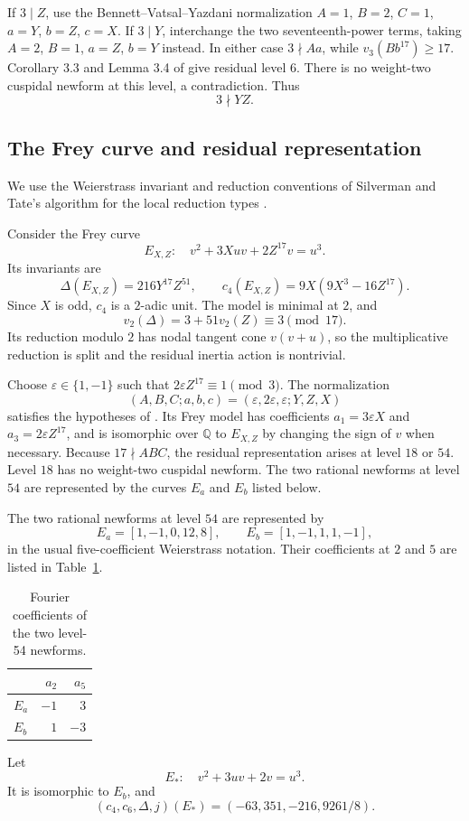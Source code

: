 \documentclass[11pt,a4paper]{article}
\theoremstyle{definition}\newtheorem{definition}[theorem]{Definition}
\theoremstyle{remark}\newtheorem{remark}[theorem]{Remark}
\begin{document}
If $3\mid Z$, use the Bennett--Vatsal--Yazdani normalization $A=1$, $B=2$, $C=1$, $a=Y$, $b=Z$, $c=X$. If $3\mid Y$, interchange the two seventeenth-power terms, taking $A=2$, $B=1$, $a=Z$, $b=Y$ instead. In either case $3\nmid Aa$, while $v_3(Bb^{17})\ge17$. Corollary 3.3 and Lemma 3.4 of \cite{BVY} give residual level $6$. There is no weight-two cuspidal newform at this level, a contradiction. Thus
\[
3\nmid YZ.
\]

\subsection{The Frey curve and residual representation}

We use the Weierstrass invariant and reduction conventions of Silverman \cite{Silverman} and Tate's algorithm for the local reduction types \cite{Tate}.

Consider the Frey curve
\[
E_{X,Z}:\quad v^2+3Xuv+2Z^{17}v=u^3.
\]
Its invariants are
\[
\Delta(E_{X,Z})=216Y^{17}Z^{51},\qquad
c_4(E_{X,Z})=9X(9X^3-16Z^{17}).
\]
Since $X$ is odd, $c_4$ is a $2$-adic unit. The model is minimal at $2$, and
\[
v_2(\Delta)=3+51v_2(Z)\equiv3\pmod{17}.
\]
Its reduction modulo $2$ has nodal tangent cone $v(v+u)$, so the multiplicative reduction is split and the residual inertia action is nontrivial.

Choose $\varepsilon\in\{1,-1\}$ such that $2\varepsilon Z^{17}\equiv1\pmod3$. The normalization
\[
(A,B,C;a,b,c)=(\varepsilon,2\varepsilon,\varepsilon;Y,Z,X)
\]
satisfies the hypotheses of \cite[Lemmas 3.1 and 3.4]{BVY}. Its Frey model has coefficients $a_1=3\varepsilon X$ and $a_3=2\varepsilon Z^{17}$, and is isomorphic over $\mathbb Q$ to $E_{X,Z}$ by changing the sign of $v$ when necessary. Because $17\nmid ABC$, the residual representation arises at level $18$ or $54$. Level $18$ has no weight-two cuspidal newform. The two rational newforms at level $54$ are represented by the curves $E_a$ and $E_b$ listed below.

The two rational newforms at level $54$ are represented by
\[
E_a=[1,-1,0,12,8],\qquad E_b=[1,-1,1,1,-1],
\]
in the usual five-coefficient Weierstrass notation. Their coefficients at
$2$ and $5$ are listed in Table~\ref{tab:1}.
\begin{table}[htbp]
\centering
\caption{Fourier coefficients of the two level-54 newforms.}\label{tab:1}
\begin{tabular}{lrr}
\toprule
 & $a_2$ & $a_5$\\
\midrule
$E_a$ & $-1$ & $3$\\
$E_b$ & $1$ & $-3$\\
\bottomrule
\end{tabular}
\end{table}
Let
\[
E_*:\quad v^2+3uv+2v=u^3.
\]
It is isomorphic to $E_b$, and
\[
(c_4,c_6,\Delta,j)(E_*)=(-63,351,-216,9261/8).
\]
\end{document}
